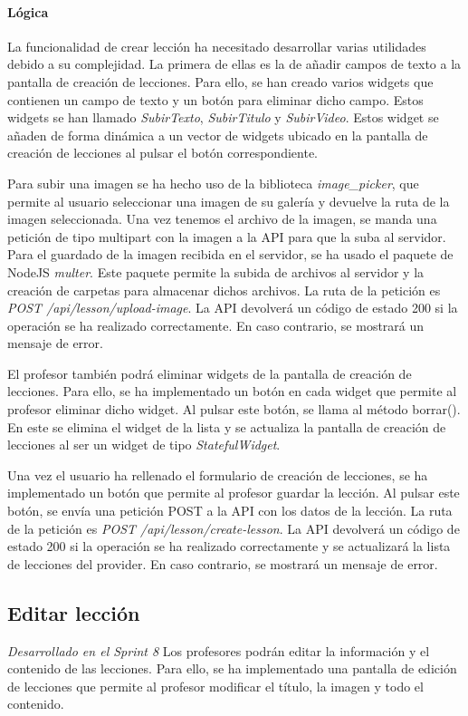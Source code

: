 \paragraph*{Lógica}
La funcionalidad de crear lección ha necesitado desarrollar varias utilidades debido a su complejidad. 
La primera de ellas es la de añadir campos de texto a la pantalla de creación de lecciones. Para ello, se han creado varios widgets que contienen un campo de texto y un botón para eliminar dicho campo. Estos widgets se han llamado \textit{SubirTexto}, \textit{SubirTitulo} y \textit{SubirVideo}. 
Estos widget se añaden de forma dinámica a un vector de widgets ubicado en la pantalla de creación de lecciones al pulsar el botón correspondiente.

Para subir una imagen se ha hecho uso de la biblioteca \textit{image\_picker}, que permite al usuario seleccionar una imagen de su galería y
devuelve la ruta de la imagen seleccionada. Una vez tenemos el archivo de la imagen, se manda una petición de tipo multipart con la imagen a la API para que la suba al servidor.
Para el guardado de la imagen recibida en el servidor, se ha usado el paquete de NodeJS \textit{multer}. Este paquete permite la subida de archivos al servidor y la creación de carpetas para almacenar dichos archivos.
La ruta de la petición es \textit{POST /api/lesson/upload-image}. La API devolverá un código de estado 200 si la operación se ha realizado correctamente. En caso contrario, se mostrará un mensaje de error.

El profesor también podrá eliminar widgets de la pantalla de creación de lecciones. Para ello, se ha implementado un botón en cada widget que permite al profesor eliminar dicho widget. Al pulsar este botón, se llama al método borrar(). En este se elimina el widget de la lista y se actualiza la pantalla de creación de lecciones al ser un widget de tipo \textit{StatefulWidget}.

Una vez el usuario ha rellenado el formulario de creación de lecciones, se ha implementado un botón que permite al profesor guardar la lección. Al pulsar este botón, se envía una petición POST a la API con los datos de la lección. La ruta de la petición es \textit{POST /api/lesson/create-lesson}. La API devolverá un código de estado 200 si la operación se ha realizado correctamente y se actualizará la lista de lecciones del provider. En caso contrario, se mostrará un mensaje de error.


\subsection{Editar lección} 
\textit{Desarrollado en el Sprint 8}
Los profesores podrán editar la información y el contenido de las lecciones. Para ello, se ha implementado una pantalla de edición de lecciones que permite al profesor modificar el título, la imagen y todo el contenido.

